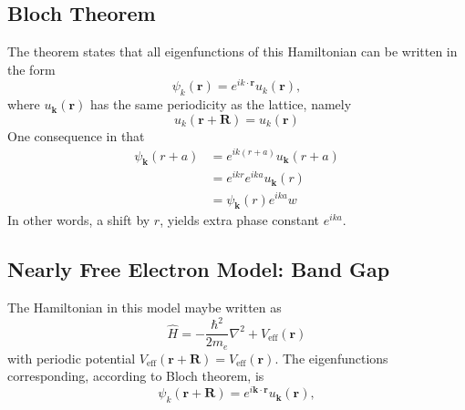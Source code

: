 \documentclass[../../../main.tex]{subfiles}
\begin{document}
\subsection{Bloch Theorem}
The theorem states that all eigenfunctions of this Hamiltonian can be written in the form
\begin{equation*}
    \psi_{k}(\mathbf{r}) = e^{i k \cdot \mathbf{r}} u_{k}(\mathbf{r}),
\end{equation*}
where $u_\mathbf{k}(\mathbf{r})$ has the same periodicity as the lattice, namely
\begin{equation*}
    u_{k}(\mathbf{r} + \mathbf{R}) = u_{k}(\mathbf{r})
\end{equation*}
One consequence in that
\begin{align*}
    \psi_{\mathbf{k}}(r + a) & = e^{ik(r+a)}u_{\mathbf{k}}(r + a)  \\
                             & = e^{ikr} e^{ika} u_{\mathbf{k}}(r) \\
                             & = \psi_{\mathbf{k}}(r) e^{ika}w
\end{align*}
In other words, a shift by $r$, yields extra phase constant $e^{ika}$.

\subsection{Nearly Free Electron Model: Band Gap}
The Hamiltonian in this model maybe written as
\begin{equation*}
    \hat{H} = -\frac{\hbar^{2}}{2m_{e}} \nabla^{2} + V_{\mathrm{eff}}(\mathbf{r})
\end{equation*}
with periodic potential $V_\text{eff}(\mathbf{r }+\mathbf{R })=V_\text{eff}(\mathbf{r})$.
The eigenfunctions corresponding, according to Bloch theorem, is
\begin{equation*}
    \psi_{k}(\mathbf{r} + \mathbf{R}) = e^{i \mathbf{k} \cdot \mathbf{r}} u_{\mathbf{k}}(\mathbf{r}),
\end{equation*}
\end{document}
